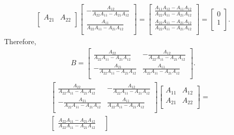 \documentclass[12pt]{article}
\begin{document}
\begin{enumerate}
\begin{align*}
\begin{bmatrix}
        A_{21} & A_{22}\\
      \end{bmatrix}
      \begin{bmatrix}
        -\frac{A_{12}}{A_{22}A_{11} - A_{21}A_{12}}\\
        \frac{A_{11}}{A_{22}A_{11} - A_{21}A_{12}}\\
      \end{bmatrix}
      =
      \begin{bmatrix}
        \frac{A_{11}A_{12} - A_{11}A_{12}}
             {A_{22}A_{11} - A_{21}A_{12}}\\
        \frac{A_{22}A_{11} - A_{21}A_{12}}
             {A_{22}A_{11} - A_{21}A_{12}}\\
      \end{bmatrix}
      =
      \begin{bmatrix}
        0\\
        1\\
      \end{bmatrix}.
    \end{align*}
    Therefore,
    \begin{align*}
      B =
      \begin{bmatrix}
        \frac{A_{22}}{A_{22}A_{11} - A_{21}A_{12}} &
          -\frac{A_{12}}{A_{22}A_{11} - A_{21}A_{12}}\\
        -\frac{A_{21}}{A_{22}A_{11} - A_{21}A_{12}} &
          \frac{A_{11}}{A_{22}A_{11} - A_{21}A_{12}}\\
      \end{bmatrix}.
    \end{align*}
    \begin{align*}
      \begin{bmatrix}
        \frac{A_{22}}{A_{22}A_{11} - A_{21}A_{12}} &
          -\frac{A_{12}}{A_{22}A_{11} - A_{21}A_{12}}\\
        -\frac{A_{21}}{A_{22}A_{11} - A_{21}A_{12}} &
          \frac{A_{11}}{A_{22}A_{11} - A_{21}A_{12}}\\
      \end{bmatrix}
      \begin{bmatrix}
        A_{11} & A_{12}\\
        A_{21} & A_{22}\\
      \end{bmatrix}
      =&\\
      \begin{bmatrix}
        \frac{A_{22}A_{11} - A_{21}A_{12}}
             {A_{22}A_{11} - A_{21}A_{12}} &

\end{bmatrix}
\end{align*}
\end{enumerate}
\end{document}
